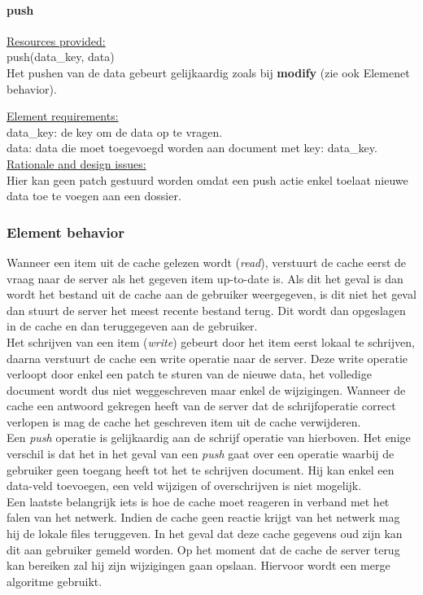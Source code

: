 \documentclass[a4paper,10pt]{article}
\begin{document}
\paragraph{push}
\underline{Resources provided:}\\
push(data\_key, data)\\
Het pushen van de data gebeurt gelijkaardig zoals bij \textbf{modify}  (zie ook Elemenet behavior).

\underline{Element requirements:}\\
data\_key: de key om de data op te vragen.\\
data: data die moet toegevoegd worden aan document met key: data\_key.\\

\underline{Rationale and design issues:}\\
Hier kan geen patch gestuurd worden omdat een push actie enkel toelaat nieuwe data toe te voegen aan een dossier.

\subsubsection{Element behavior}
Wanneer een item uit de cache gelezen wordt (\textit{read}), verstuurt de cache eerst de vraag naar de server als het gegeven item up-to-date is.  Als dit het geval is dan wordt het bestand uit de cache aan de gebruiker weergegeven, is dit niet het geval dan stuurt de server het meest recente bestand terug.  Dit wordt dan opgeslagen in de cache en dan teruggegeven aan de gebruiker.\\
Het schrijven van een item (\textit{write}) gebeurt door het item eerst lokaal te schrijven, daarna verstuurt de cache een write operatie naar de server.  Deze write operatie verloopt door enkel een patch te sturen van de nieuwe data, het volledige document wordt dus niet weggeschreven maar enkel de wijzigingen.  Wanneer de cache een antwoord gekregen heeft van de server dat de schrijfoperatie correct verlopen is mag de cache het geschreven item uit de cache verwijderen.\\
Een \textit{push} operatie is gelijkaardig aan de schrijf operatie van hierboven.  Het enige verschil is dat het in het geval van een \textit{push} gaat over een operatie waarbij de gebruiker geen toegang heeft tot het te schrijven document.  Hij kan enkel een data-veld toevoegen, een veld wijzigen of overschrijven is niet mogelijk.\\
Een laatste belangrijk iets is hoe de cache moet reageren in verband met het falen van het netwerk.  Indien de cache geen reactie krijgt van het netwerk mag hij de lokale files teruggeven.  In het geval dat deze cache gegevens oud zijn kan dit aan gebruiker gemeld worden.  Op het moment dat de cache de server terug kan bereiken zal hij zijn wijzigingen gaan opslaan.  Hiervoor wordt een merge algoritme gebruikt.
\end{document}
